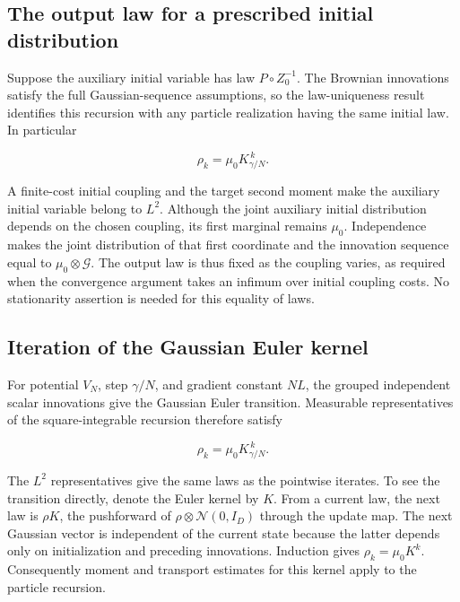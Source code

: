 \documentclass[11pt,a4paper]{article}
\begin{document}
\subsection{\texorpdfstring{The output law for a prescribed initial distribution}{The output law for a prescribed initial distribution}}


Suppose the auxiliary initial variable has law \(P\circ Z_0^{-1}\). The Brownian innovations satisfy the full Gaussian-sequence assumptions, so the law-uniqueness result identifies this recursion with any particle realization having the same initial law. In particular

\[\rho_k=\mu_0K_{\gamma/N}^{\,k}.\]

A finite-cost initial coupling and the target second moment make the auxiliary initial variable belong to \(L^2\). Although the joint auxiliary initial distribution depends on the chosen coupling, its first marginal remains \(\mu_0\). Independence makes the joint distribution of that first coordinate and the innovation sequence equal to \(\mu_0\otimes\mathcal G\). The output law is thus fixed as the coupling varies, as required when the convergence argument takes an infimum over initial coupling costs. No stationarity assertion is needed for this equality of laws.




\subsection{\texorpdfstring{Iteration of the Gaussian Euler kernel}{Iteration of the Gaussian Euler kernel}}


For potential \(V_N\), step \(\gamma/N\), and gradient constant \(NL\), the grouped independent scalar innovations give the Gaussian Euler transition. Measurable representatives of the square-integrable recursion therefore satisfy

\[\rho_k=\mu_0K_{\gamma/N}^{\,k}.\]

The \(L^2\) representatives give the same laws as the pointwise iterates. To see the transition directly, denote the Euler kernel by \(K\). From a current law, the next law is \(\rho K\), the pushforward of \(\rho\otimes\mathcal N(0,I_D)\) through the update map. The next Gaussian vector is independent of the current state because the latter depends only on initialization and preceding innovations. Induction gives \(\rho_k=\mu_0K^k\). Consequently moment and transport estimates for this kernel apply to the particle recursion.
\end{document}

